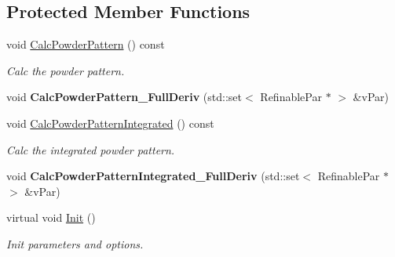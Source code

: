\subsection*{Protected Member Functions}
\begin{DoxyCompactItemize}
\item 
\mbox{\label{class_obj_cryst_1_1_powder_pattern_a9105959799a653a93a6d04429e71c68a}} 
void \mbox{\hyperlink{class_obj_cryst_1_1_powder_pattern_a9105959799a653a93a6d04429e71c68a}{Calc\+Powder\+Pattern}} () const
\begin{DoxyCompactList}\small\item\em Calc the powder pattern. \end{DoxyCompactList}\item 
\mbox{\label{class_obj_cryst_1_1_powder_pattern_ad75ff7078aba6c7bce14b6e618f0c3ea}} 
void {\bfseries Calc\+Powder\+Pattern\+\_\+\+Full\+Deriv} (std\+::set$<$ Refinable\+Par $\ast$ $>$ \&v\+Par)
\item 
\mbox{\label{class_obj_cryst_1_1_powder_pattern_a208c61a267d7b5dc7810b78f51b2aa93}} 
void \mbox{\hyperlink{class_obj_cryst_1_1_powder_pattern_a208c61a267d7b5dc7810b78f51b2aa93}{Calc\+Powder\+Pattern\+Integrated}} () const
\begin{DoxyCompactList}\small\item\em Calc the integrated powder pattern. \end{DoxyCompactList}\item 
\mbox{\label{class_obj_cryst_1_1_powder_pattern_a860f30434d3fcea2144818d6b25e3d5f}} 
void {\bfseries Calc\+Powder\+Pattern\+Integrated\+\_\+\+Full\+Deriv} (std\+::set$<$ Refinable\+Par $\ast$ $>$ \&v\+Par)
\item 
\mbox{\label{class_obj_cryst_1_1_powder_pattern_ab8abbc7c9edea701411468c5fbdcae23}} 
virtual void \mbox{\hyperlink{class_obj_cryst_1_1_powder_pattern_ab8abbc7c9edea701411468c5fbdcae23}{Init}} ()
\begin{DoxyCompactList}\small\item\em Init parameters and options. \end{DoxyCompactList}\item 

\end{DoxyCompactItemize}
